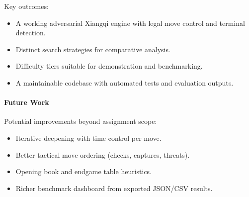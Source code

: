 \documentclass[a4paper,12pt]{article}
\begin{document}
Key outcomes:
\begin{itemize}
    \item A working adversarial Xiangqi engine with legal move control and terminal detection.
    \item Distinct search strategies for comparative analysis.
    \item Difficulty tiers suitable for demonstration and benchmarking.
    \item A maintainable codebase with automated tests and evaluation outputs.
\end{itemize}

\paragraph{Future Work}
Potential improvements beyond assignment scope:
\begin{itemize}
  \item Iterative deepening with time control per move.
  \item Better tactical move ordering (checks, captures, threats).
  \item Opening book and endgame table heuristics.
  \item Richer benchmark dashboard from exported JSON/CSV results.
\end{itemize}
\end{document}
